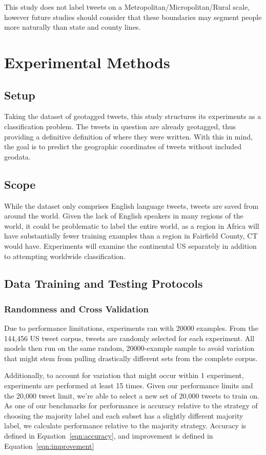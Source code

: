 \documentclass[midd]{thesis}
\begin{document}
This study does not label tweets on a Metropolitan/Micropolitan/Rural scale, however future studies should consider that these boundaries may segment people more naturally than state and county lines.

\chapter{Experimental Methods}

\section{Setup}
Taking the dataset of geotagged tweets, this study structures its experiments as a classification problem. The tweets in question are already geotagged, thus providing a definitive definition of where they were written. With this in mind, the goal is to predict the geographic coordinates of tweets without included geodata.

\section{Scope}
While the dataset only comprises English language tweets, tweets are saved from around the world. Given the lack of English speakers in many regions of the world, it could be problematic to label the entire world, as a region in Africa will have substantially fewer training examples than a region in Fairfield County, CT would have. Experiments will examine the continental US separately in addition to attempting worldwide classification.



\section{Data Training and Testing Protocols}

\subsection{Randomness and Cross Validation}
Due to performance limitations,  experiments ran with 20000 examples. From the 144,456 US tweet corpus, tweets are randomly selected for each experiment. All models then run on the same random, 20000-example sample to avoid variation that might stem from pulling drastically different sets from the complete corpus.

Additionally, to account for variation that might occur within 1 experiment, experiments are performed at least 15 times. Given our performance limits and the 20,000 tweet limit, we're able to select a new set of 20,000 tweets to train on. As one of our benchmarks for performance is accuracy relative to the strategy of choosing the majority label and each subset has a slightly different majority label, we calculate performance relative to  the majority strategy. Accuracy is defined in Equation~\ref{eqn:accuracy}, and improvement is defined in Equation~\ref{eqn:improvement}
\end{document}
